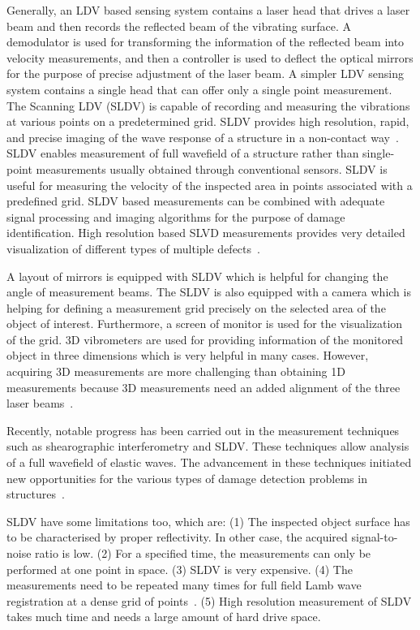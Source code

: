 \documentclass[b5paper, 11pt, titlepage]{book}
\begin{document}
Generally, an LDV based sensing system contains a laser head that drives a laser beam and then records the reflected beam of the vibrating surface. A demodulator is used for transforming the information of the reflected beam into velocity measurements, and then a controller is used to deflect the optical mirrors for the purpose of precise adjustment of the laser beam. A simpler LDV sensing system contains a single head that can offer only a single point measurement. The Scanning LDV (SLDV) is capable of recording and measuring the vibrations at various points on a predetermined grid. SLDV provides high resolution, rapid, and precise imaging of the wave response of a structure in a non-contact way~\cite{Mitra2016}. SLDV enables measurement of full wavefield of a structure rather than single-point measurements usually obtained through conventional sensors. SLDV is useful for measuring the velocity of the inspected area in points associated with a predefined grid. SLDV based measurements can be combined with adequate signal processing and imaging algorithms for the purpose of damage identification. High resolution based SLVD measurements provides very detailed visualization of different types of multiple defects~\cite{Kudela2015}.

A layout of mirrors is equipped with SLDV which is helpful for changing the angle of measurement beams. The SLDV is also equipped with a camera which is helping for defining a measurement grid precisely on the selected area of the object of interest. Furthermore, a screen of monitor is used for the visualization of the grid. 3D vibrometers are used for providing information of the monitored object in three dimensions which is very helpful in many cases. However, acquiring 3D measurements are more challenging than obtaining 1D measurements because 3D measurements need an added alignment of the three laser beams~\cite{Ostachowicz2014}.

Recently, notable progress has been carried out in the measurement techniques such as shearographic interferometry and SLDV. These techniques allow analysis of a full wavefield of elastic waves. The advancement in these techniques initiated new opportunities for the various types of damage detection problems in structures~\cite{Mitra2016}.

SLDV have some limitations too, which are: (1) The inspected object surface has to be characterised by proper reflectivity. In other case, the acquired signal-to-noise ratio is low. (2) For a specified time, the measurements can only be performed at one point in space. (3) SLDV is very expensive. (4) The measurements need to be repeated many times for full field Lamb wave registration at a dense grid of points~\cite{Ostachowicz2014}.
(5) High resolution measurement of SLDV takes much time and needs a large amount of hard drive space.
\end{document}
